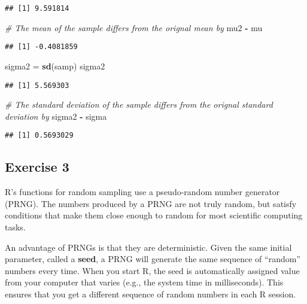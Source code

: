 \documentclass[
]{article}
\newenvironment{Shaded}{\begin{snugshade}}{\end{snugshade}}
\newcommand{\CommentTok}[1]{\textcolor[rgb]{0.56,0.35,0.01}{\textit{#1}}}
\newcommand{\KeywordTok}[1]{\textcolor[rgb]{0.13,0.29,0.53}{\textbf{#1}}}
\newcommand{\NormalTok}[1]{#1}
\newcommand{\OperatorTok}[1]{\textcolor[rgb]{0.81,0.36,0.00}{\textbf{#1}}}
\newcommand{\StringTok}[1]{\textcolor[rgb]{0.31,0.60,0.02}{#1}}
\begin{document}
\begin{verbatim}
## [1] 9.591814
\end{verbatim}

\begin{Shaded}
\begin{Highlighting}[]
\CommentTok{\# The mean of the sample differs from the orignal mean by}
\NormalTok{mu2 }\OperatorTok{{-}}\StringTok{ }\NormalTok{mu}
\end{Highlighting}
\end{Shaded}

\begin{verbatim}
## [1] -0.4081859
\end{verbatim}

\begin{Shaded}
\begin{Highlighting}[]
\NormalTok{sigma2 =}\StringTok{ }\KeywordTok{sd}\NormalTok{(samp)}
\NormalTok{sigma2}
\end{Highlighting}
\end{Shaded}

\begin{verbatim}
## [1] 5.569303
\end{verbatim}

\begin{Shaded}
\begin{Highlighting}[]
\CommentTok{\# The standard deviation of the sample differs from the orignal standard deviation by}
\NormalTok{sigma2 }\OperatorTok{{-}}\StringTok{ }\NormalTok{sigma}
\end{Highlighting}
\end{Shaded}

\begin{verbatim}
## [1] 0.5693029
\end{verbatim}

\hypertarget{exercise-3}{%
\subsection{Exercise 3}\label{exercise-3}}

R's functions for random sampling use a pseudo-random number generator
(PRNG). The numbers produced by a PRNG are not truly random, but satisfy
conditions that make them close enough to random for most scientific
computing tasks.

An advantage of PRNGs is that they are deterministic. Given the same
initial parameter, called a \textbf{seed}, a PRNG will generate the same
sequence of ``random'' numbers every time. When you start R, the seed is
automatically assigned value from your computer that varies (e.g., the
system time in milliseconds). This ensures that you get a different
sequence of random numbers in each R session.
\end{document}

